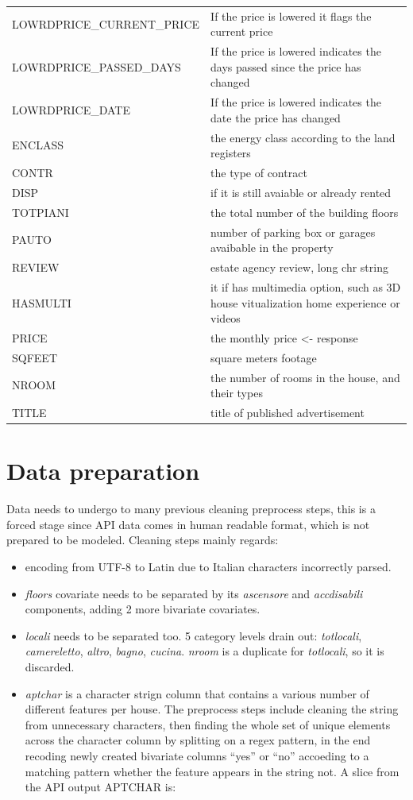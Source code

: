 \documentclass[
  12pt,
  a4paper,
  oneside]{book}
\providecommand{\tightlist}{%
  \setlength{\itemsep}{0pt}\setlength{\parskip}{0pt}}
\theoremstyle{definition}
\theoremstyle{definition}
\theoremstyle{definition}
\theoremstyle{remark}
\begin{document}
\begin{longtable}{ll}
LOWRDPRICE\_CURRENT\_PRICE & If the price is lowered it flags the current price\\
\addlinespace
LOWRDPRICE\_PASSED\_DAYS & If the price is lowered indicates the days passed since the price has changed\\
LOWRDPRICE\_DATE & If the price is lowered indicates the date the price has changed\\
ENCLASS & the energy class according to the land registers\\
CONTR & the type of contract\\
DISP & if it is still avaiable or already rented\\
\addlinespace
TOTPIANI & the total number of the building floors\\
PAUTO & number of parking box or garages avaibable in the property\\
REVIEW & estate agency review, long chr string\\
HASMULTI & it if has multimedia option, such as 3D house vitualization home experience or videos\\
PRICE & the monthly price <- response\\
\addlinespace
SQFEET & square meters footage\\
NROOM & the number of rooms in the house, and their types\\
TITLE & title of published advertisement\\
\bottomrule
\end{longtable}

\hypertarget{prep}{%
\section{Data preparation}\label{prep}}

Data needs to undergo to many previous cleaning preprocess steps, this is a forced stage since API data comes in human readable format, which is not prepared to be modeled. Cleaning steps mainly regards:

\begin{itemize}
\tightlist
\item
  encoding from UTF-8 to Latin due to Italian characters incorrectly parsed.
\item
  \emph{floors} covariate needs to be separated by its \emph{ascensore} and \emph{accdisabili} components, adding 2 more bivariate covariates.
\item
  \emph{locali} needs to be separated too. 5 category levels drain out: \emph{totlocali}, \emph{camereletto}, \emph{altro}, \emph{bagno}, \emph{cucina}. \emph{nroom} is a duplicate for \emph{totlocali}, so it is discarded.
\item
  \emph{aptchar} is a character strign column that contains a various number of different features per house. The preprocess steps include cleaning the string from unnecessary characters, then finding the whole set of unique elements across the character column by splitting on a regex pattern, in the end recoding newly created bivariate columns ``yes'' or ``no'' accoeding to a matching pattern whether the feature appears in the string not. A slice from the API output APTCHAR is:
\end{itemize}
\end{document}
